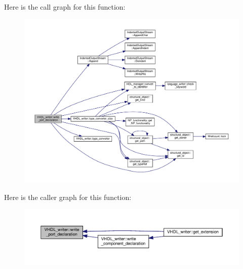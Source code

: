 Here is the call graph for this function\+:
\nopagebreak
\begin{figure}[H]
\begin{center}
\leavevmode
\includegraphics[width=350pt]{d0/d0c/structVHDL__writer_a2d88694c56cecd9e97117da37c3cf0d3_cgraph}
\end{center}
\end{figure}
Here is the caller graph for this function\+:
\nopagebreak
\begin{figure}[H]
\begin{center}
\leavevmode
\includegraphics[width=350pt]{d0/d0c/structVHDL__writer_a2d88694c56cecd9e97117da37c3cf0d3_icgraph}
\end{center}
\end{figure}
\mbox{\label{structVHDL__writer_a24689039313dfd370692b4c13f2c8862}} 
